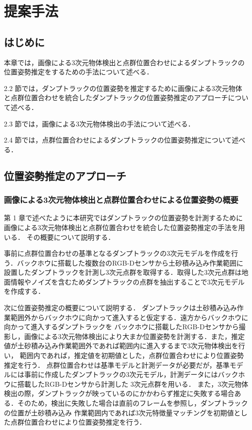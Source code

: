 \chapter{提案手法}
\thispagestyle{empty}
\label{chap2}
\minitoc

\newpage
\section{はじめに}
本章では，画像による3次元物体検出と点群位置合わせによるダンプトラックの位置姿勢推定をするための手法について述べる．
\par
2.2 節では，ダンプトラックの位置姿勢を推定するために画像による3次元物体と点群位置合わせを統合したダンプトラックの位置姿勢推定のアプローチについて述べる．
\par
2.3 節では，画像による3次元物体検出の手法について述べる．
\par
2.4 節では，点群位置合わせによるダンプトラックの位置姿勢推定について述べる．
\newpage

\section{位置姿勢推定のアプローチ}
\subsection{画像による3次元物体検出と点群位置合わせによる位置姿勢の概要}
第 1 章で述べたように本研究ではダンプトラックの位置姿勢を計測するために画像による3次元物体検出と点群位置合わせを統合した位置姿勢推定の手法を用いる．
その概要について説明する．
\par
事前に点群位置合わせの基準となるダンプトラックの3次元モデルを作成を行う．バックホウに搭載した複数台のRGB-Dセンサから土砂積み込み作業範囲に
設置したダンプトラックを計測し3次元点群を取得する．取得した3次元点群は地面情報やノイズを含むためダンプトラックの点群を抽出することで3次元モデルを作成する．
\par
次に位置姿勢推定の概要について説明する．
ダンプトラックは土砂積み込み作業範囲外からバックホウに向かって進入すると仮定する．遠方からバックホウに向かって進入するダンプトラックを
バックホウに搭載したRGB-Dセンサから撮影し，画像による3次元物体検出により大まか位置姿勢を計測する．また，推定値が土砂積み込み作業範囲外であれば範囲内に進入するまで3次元物体検出を行い，
範囲内であれば，推定値を初期値とした，点群位置合わせにより位置姿勢推定を行う．
点群位置合わせは基準モデルと計測データが必要だが，基準モデルには事前に作成したダンプトラックの3次元モデル，計測データにはバックホウに搭載したRGB-Dセンサから計測した
3次元点群を用いる．
また，3次元物体検出の際，ダンプトラックが映っているのにかかわらず推定に失敗する場合ある．そのため，検出に失敗した場合は直前のフレームを参照し，ダンプトラックの位置が土砂積み込み
作業範囲内であれば3次元特徴量マッチングを初期値とした点群位置合わせにより位置姿勢推定を行う．
\newpage
